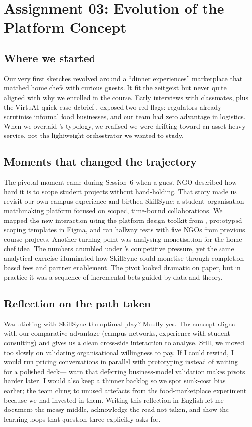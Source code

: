 \section*{Assignment 03: Evolution of the Platform Concept}

\subsection*{Where we started}
Our very first sketches revolved around a ``dinner experiences'' marketplace that matched home chefs with curious guests. It fit the zeitgeist but never quite aligned with why we enrolled in the course. Early interviews with classmates, plus the VirtuAI quick-case debrief \citep{Gunasilan2024}, exposed two red flags: regulators already scrutinise informal food businesses, and our team had zero advantage in logistics. When we overlaid \citet{Choudary2016}'s typology, we realised we were drifting toward an asset-heavy service, not the lightweight orchestrator we wanted to study.

\subsection*{Moments that changed the trajectory}
The pivotal moment came during Session~6 when a guest NGO described how hard it is to scope student projects without hand-holding. That story made us revisit our own campus experience and birthed SkillSync: a student--organisation matchmaking platform focused on scoped, time-bound collaborations. We mapped the new interaction using the platform design toolkit from \citet{Reillier2017}, prototyped scoping templates in Figma, and ran hallway tests with five NGOs from previous course projects. Another turning point was analysing monetisation for the home-chef idea. The numbers crumbled under \citet{Porter2008}'s competitive pressure, yet the same analytical exercise illuminated how SkillSync could monetise through completion-based fees and partner enablement. The pivot looked dramatic on paper, but in practice it was a sequence of incremental bets guided by data and theory.

\subsection*{Reflection on the path taken}
Was sticking with SkillSync the optimal play? Mostly yes. The concept aligns with our comparative advantage (campus networks, experience with student consulting) and gives us a clean cross-side interaction to analyse. Still, we moved too slowly on validating organisational willingness to pay. If I could rewind, I would run pricing conversations in parallel with prototyping instead of waiting for a polished deck---\citet{HagiuWright2013} warn that deferring business-model validation makes pivots harder later. I would also keep a thinner backlog so we spot sunk-cost bias earlier; the team clung to unused artefacts from the food-marketplace experiment because we had invested in them. Writing this reflection in English let me document the messy middle, acknowledge the road not taken, and show the learning loops that question three explicitly asks for.

